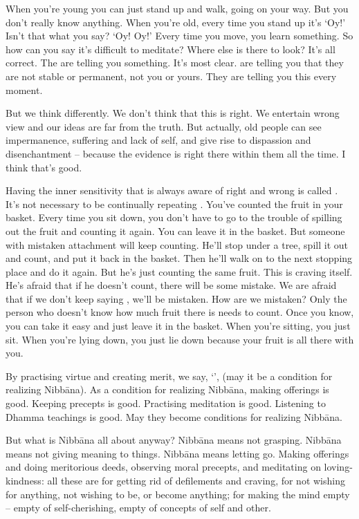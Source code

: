 When you're young you can just stand up and walk, going on your way. But you don't really know anything. When you're old, every time you stand up it's `Oy!' Isn't that what you say? `Oy! Oy!' Every time you move, you learn something. So how can you say it's difficult to meditate? Where else is there to look? It's all correct. The  are telling you something. It's most clear.  are telling you that they are not stable or permanent, not you or yours. They are telling you this every moment. 

But we think differently. We don't think that this is right. We entertain wrong view and our ideas are far from the truth. But actually, old people can see impermanence, suffering and lack of self, and give rise to dispassion and disenchantment -- because the evidence is right there within them all the time. I think that's good. 

Having the inner sensitivity that is always aware of right and wrong is called . It's not necessary to be continually repeating . You've counted the fruit in your basket. Every time you sit down, you don't have to go to the trouble of spilling out the fruit and counting it again. You can leave it in the basket. But someone with mistaken attachment will keep counting. He'll stop under a tree, spill it out and count, and put it back in the basket. Then he'll walk on to the next stopping place and do it again. But he's just counting the same fruit. This is craving itself. He's afraid that if he doesn't count, there will be some mistake. We are afraid that if we don't keep saying , we'll be mistaken. How are we mistaken? Only the person who doesn't know how much fruit there is needs to count. Once you know, you can take it easy and just leave it in the basket. When you're sitting, you just sit. When you're lying down, you just lie down because your fruit is all there with you. 

By practising virtue and creating merit, we say, `', (may it be a condition for realizing Nibb\=ana). As a condition for realizing Nibb\=ana, making offerings is good. Keeping precepts is good. Practising meditation is good. Listening to Dhamma teachings is good. May they become conditions for realizing Nibb\=ana. 

But what is Nibb\=ana all about anyway? Nibb\=ana means not grasping. Nibb\=ana means not giving meaning to things. Nibb\=ana means letting go. Making offerings and doing meritorious deeds, observing moral precepts, and meditating on loving-kindness: all these are for getting rid of defilements and craving, for not wishing for anything, not wishing to be, or become anything; for making the mind empty -- empty of self-cherishing, empty of concepts of self and other. 


